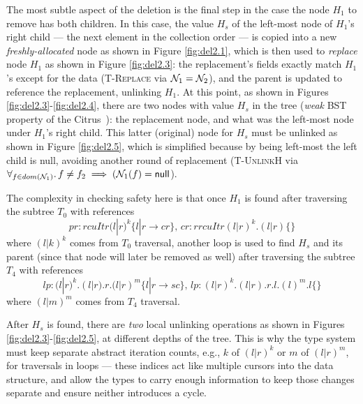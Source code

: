 The most subtle aspect of the deletion is the final step in the case the node $H_1$ to remove has both children. In this case, the value $H_s$ of the left-most node of $H_1$'s right child --- the next element in the collection order --- is copied into a new \textit{freshly-allocated} node as shown in Figure \ref{fig:del2.1}, which is then used to \emph{replace} node $H_1$ as shown in Figure \ref{fig:del2.3}: the replacement's fields exactly match $H_1$'s except for the data (\textsc{T-Replace} via $\mathcal{N}_1 = \mathcal{N}_2$), and the parent is updated to reference the replacement, unlinking $H_1$. At this point, as shown in Figures \ref{fig:del2.3}-\ref{fig:del2.4}, there are two nodes with value $H_s$ in the tree (\textit{weak} BST property of the Citrus~\cite{Arbel:2014:CUR:2611462.2611471}): the replacement node, and what was the left-most node under $H_1$'s right child. This latter (original) node for $H_s$ must be unlinked as shown in Figure \ref{fig:del2.5}, which is simplified because by being left-most the left child is null, avoiding another round of replacement (\textsc{T-UnlinkH} via $\forall_{f\in dom(\mathcal{N}_1)} \ldotp f\neq f_2 \implies (\mathcal{N}_1(f) = \textsf{null}$).

The complexity in checking safety here is that once $H_1$ is found after traversing the subtree $T_0$ with references
\[ pr:rcuItr(l|r)^{k} \{l|r \rightarrow cr\},\, cr:rrcuItr(l|r)^{k}.(l|r) \{\}\]
where $(l|k)^{k}$ comes from $T_0$ traversal, another loop is used to find $H_s$ and its parent (since that node will later be removed as well) after traversing the subtree $T_4$ with references
\[lp:(l|r)^{k}.(l|r).r.(l|r)^{m} \{l|r \rightarrow sc\},\, lp:(l|r)^{k}.(l|r).r.l.(l)^{m}.l\{\}\]
where $(l|m)^{m}$ comes from $T_4$ traversal.

After $H_s$ is found, there are \emph{two} local unlinking operations as shown in Figures \ref{fig:del2.3}-\ref{fig:del2.5}, at different depths of the tree.  This is why the type system must keep separate abstract iteration counts, e.g., $k$ of $(l|r)^{k}$ or $m$ of $(l|r)^{m}$, for traversals in loops --- these indices act like multiple cursors into the data structure, and allow the types to carry enough information to keep those changes separate and ensure neither introduces a cycle.


